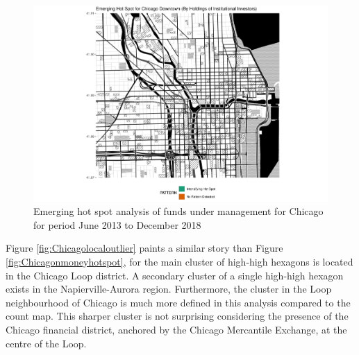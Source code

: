 \begin{figure}
	\centering
	\includegraphics[width=1\linewidth]{Figures/ChapterIV/Chi_Money_EH_Downtown}
	\caption[Emerging Hot Spot Analysis of Funds Under Management for Downtown Chicago 2013-2018]{Emerging hot spot analysis of funds under management for Chicago for period June 2013 to December 2018}
	\label{fig:Chicagonmoneyhotspot_Downtown}
\end{figure}

Figure \ref{fig:Chicagolocaloutlier} paints a similar story than Figure \ref{fig:Chicagonmoneyhotspot}, for the main cluster of high-high hexagons is located in the Chicago Loop district.  A secondary cluster of a single high-high hexagon exists in the Napierville-Aurora region.  Furthermore, the cluster in the Loop neighbourhood of Chicago is much more defined in this analysis compared to the count map. This sharper cluster is not surprising considering the presence of the Chicago financial district, anchored by the Chicago Mercantile Exchange, at the centre of the Loop.


